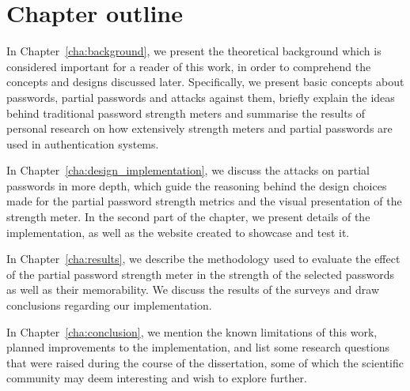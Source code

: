   \section{Chapter outline}
    \label{sec:outline}
    In Chapter~\ref{cha:background}, we present the theoretical background which is considered important for a reader of this work, in order to comprehend the concepts and designs discussed later. Specifically, we present basic concepts about passwords, partial passwords and attacks against them, briefly explain the ideas behind traditional password strength meters and summarise the results of personal research on how extensively strength meters and partial passwords are used in authentication systems.

    In Chapter~\ref{cha:design_implementation}, we discuss the attacks on partial passwords in more depth, which guide the reasoning behind the design choices made for the partial password strength metrics and the visual presentation of the strength meter. In the second part of the chapter, we present details of the implementation, as well as the website created to showcase and test it.

    In Chapter~\ref{cha:results}, we describe the methodology used to evaluate the effect of the partial password strength meter in the strength of the selected passwords as well as their memorability. We discuss the results of the surveys and draw conclusions regarding our implementation.

    In Chapter~\ref{cha:conclusion}, we mention the known limitations of this work, planned improvements to the implementation, and list some research questions that were raised during the course of the dissertation, some of which the scientific community may deem interesting and wish to explore further.
